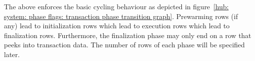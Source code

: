 The above enforces the basic cycling behaviour as depicted in figure~\ref{hub: system: phase flags: transaction phase transition graph}. Prewarming rows (if any) lead to initialization rows which lead to execution rows which lead to finalization rows. Furthermore, the finalization phase may only end on a row that peeks into transaction data. The number of rows of each phase will be specified later.
